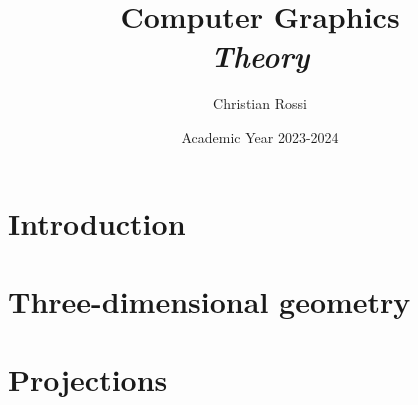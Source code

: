 \documentclass[12pt, a4paper]{report}
\title{Computer Graphics \\ \textit{Theory}}
\author{Christian Rossi}
\date{Academic Year 2023-2024}
\begin{document}
    \maketitle

    

    \cleardoublepage

    \tableofcontents

    \cleardoublepage

    \chapter{Introduction}
    
    
    

    \chapter{Three-dimensional geometry}
    
    
    
    

    \chapter{Projections}
    
    
    
    
    
    
\end{document}
